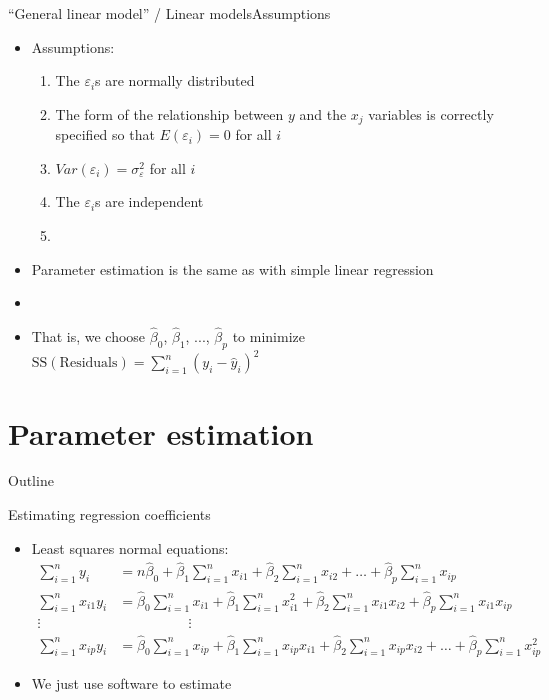 \documentclass[xcolor=dvipsnames]{beamer}
\begin{document}
\begin{frame}{``General linear model'' / Linear models}{Assumptions}
\begin{itemize}
	\item Assumptions: \pause
	\begin{enumerate}
		\item The $\varepsilon_i$s are normally distributed  \pause
		\item The form of the relationship between $y$ and the $x_j$ variables is correctly specified so that $E(\varepsilon_i) = 0$ for all $i$ \pause
		\item $Var(\varepsilon_i) = \sigma_{\varepsilon}^2$ for all $i$ \pause
		\item The $\varepsilon_i$s are independent \pause
		\item[]
	\end{enumerate}	
	\item Parameter estimation is the same as with simple linear regression \pause
	\item[]
	\item That is, we choose $\hat{\beta}_0$, $\hat{\beta}_1$, ..., $\hat{\beta}_p$ to minimize $\text{SS}(\text{Residuals}) = \sum_{i=1}^n (y_i -\hat{y}_i)^2$
\end{itemize}
\end{frame}

\section{Parameter estimation}
\begin{frame}{Outline}
	\tableofcontents[currentsection,subsectionstyle=show/shaded/hide]
\end{frame}

\begin{frame}{Estimating regression coefficients}
	\begin{itemize}
		\item Least squares normal equations: \pause
		\begin{align*}
		\sum_{i=1}^n y_i &= n \hat{\beta}_0 + \hat{\beta}_1 \sum_{i=1}^n x_{i1} +  \hat{\beta}_2 \sum_{i=1}^n x_{i2} + \hdots + \hat{\beta}_p \sum_{i=1}^n x_{ip} \\
		\sum_{i=1}^n x_{i1} y_i &= \hat{\beta}_0 \sum_{i=1}^n x_{i1} + \hat{\beta}_1 \sum_{i=1}^n x^2_{i1} + \hat{\beta}_2 \sum_{i=1}^n x_{i1} x_{i2} + \hat{\beta}_p \sum_{i=1}^n x_{i1} x_{ip} \\
		\vdots & \quad \quad \quad \quad \quad \vdots \\
		\sum_{i=1}^n x_{ip} y_i &=  \hat{\beta}_0 \sum_{i=1}^n x_{ip} + \hat{\beta}_1 \sum_{i=1}^n x_{ip} x_{i1} + \hat{\beta}_2 \sum_{i=1}^n x_{ip} x_{i2} + \hdots + \hat{\beta}_p \sum_{i=1}^n x^2_{ip} 
		\end{align*} \pause
		\item We just use software to estimate
	\end{itemize}
\end{frame}
\end{document}
